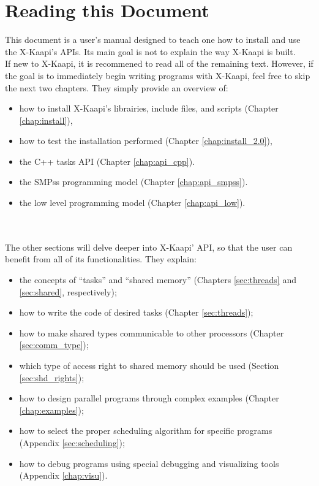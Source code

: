 \documentclass{report}[12pt]
\newcommand{\kaapi}{\textsc{X}-Kaapi\xspace}
\begin{document}
\newpage
\section*{Reading this Document}
This document is a user's manual designed to teach one how to install and use the \kaapi's APIs.  Its main goal is not to explain the way \kaapi  is built. \\

If new to \kaapi, it is recommened to read all of the remaining text.  However, if the goal is to immediately begin writing programs with \kaapi , feel free to skip the next two chapters.  They simply provide an overview of:
\begin{itemize}
\item how to install \kaapi's librairies, include files, and scripts (Chapter \ref{chap:install}),
\item how to test the installation performed (Chapter \ref{chap:install_2.0}),
\item the C++ tasks API (Chapter \ref{chap:api_cpp}).
\item the SMPss programming model (Chapter \ref{chap:api_smpss}).
\item the low level programming model (Chapter \ref{chap:api_low}).
\end{itemize}

~\\~\\The other sections will delve deeper into \kaapi' API, so that the user can benefit from all of its functionalities. They explain: 
\begin{itemize}
\item the concepts of ``tasks'' and ``shared memory'' (Chapters \ref{sec:threads} and \ref{sec:shared}, respectively);
\item how to write the code of desired tasks (Chapter \ref{sec:threads});
\item how to make shared types communicable to other processors (Chapter \ref{sec:comm_type});
\item which type of access right to shared memory should be used (Section \ref{sec:shd_rights});
\item how to design parallel programs through complex examples (Chapter \ref{chap:examples});
\item how to select the proper scheduling algorithm for specific programs (Appendix \ref{sec:scheduling});
\item how to debug programs using special debugging and visualizing tools (Appendix \ref{chap:visu}).
\end{itemize}











\end{document}
